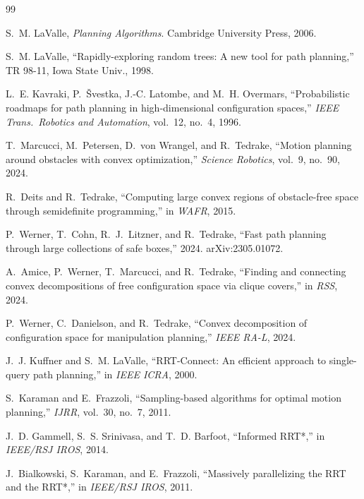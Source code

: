 \documentclass[journal]{IEEEtran}
\begin{document}

\begin{thebibliography}{99}

S.~M. LaValle, \emph{Planning Algorithms}. Cambridge University Press, 2006.

S.~M. LaValle, ``Rapidly-exploring random trees: A new tool for path planning,'' TR 98-11, Iowa State Univ., 1998.

L.~E. Kavraki, P.~\v{S}vestka, J.-C. Latombe, and M.~H. Overmars, ``Probabilistic roadmaps for path planning in high-dimensional configuration spaces,'' \emph{IEEE Trans.\ Robotics and Automation}, vol.~12, no.~4, 1996.

T.~Marcucci, M.~Petersen, D.~von Wrangel, and R.~Tedrake, ``Motion planning around obstacles with convex optimization,'' \emph{Science Robotics}, vol.~9, no.~90, 2024.

R.~Deits and R.~Tedrake, ``Computing large convex regions of obstacle-free space through semidefinite programming,'' in \emph{WAFR}, 2015.

P.~Werner, T.~Cohn, R.~J.~Litzner, and R.~Tedrake, ``Fast path planning through large collections of safe boxes,'' 2024. arXiv:2305.01072.

A.~Amice, P.~Werner, T.~Marcucci, and R.~Tedrake, ``Finding and connecting convex decompositions of free configuration space via clique covers,'' in \emph{RSS}, 2024.

P.~Werner, C.~Danielson, and R.~Tedrake, ``Convex decomposition of configuration space for manipulation planning,'' \emph{IEEE RA-L}, 2024.

J.~J. Kuffner and S.~M. LaValle, ``RRT-Connect: An efficient approach to single-query path planning,'' in \emph{IEEE ICRA}, 2000.

S.~Karaman and E.~Frazzoli, ``Sampling-based algorithms for optimal motion planning,'' \emph{IJRR}, vol.~30, no.~7, 2011.

J.~D. Gammell, S.~S. Srinivasa, and T.~D. Barfoot, ``Informed RRT*,'' in \emph{IEEE/RSJ IROS}, 2014.

J.~Bialkowski, S.~Karaman, and E.~Frazzoli, ``Massively parallelizing the RRT and the RRT*,'' in \emph{IEEE/RSJ IROS}, 2011.


\end{thebibliography}
\end{document}
